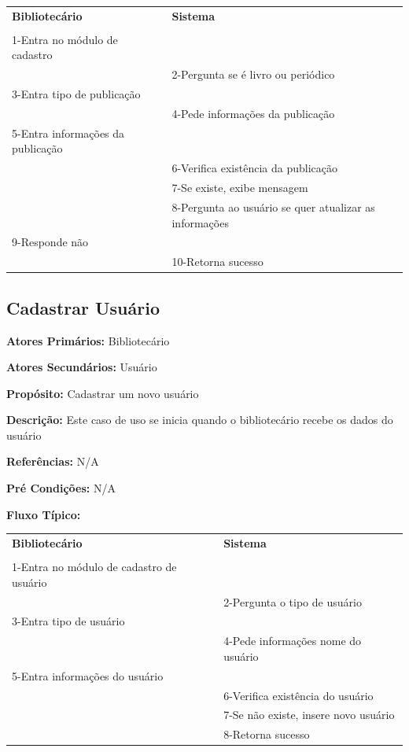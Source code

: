 \documentclass[
	12pt,				%
	openright,			%
	oneside,			%
	a4paper,			%
	english,			%
	brazil				%
	]{abntex2}
\begin{document}
\begin{table}[H]
\ABNTEXfontereduzida
\begin{center}
\begin{tabular}{p{5.5cm} p{5.5cm}}
    \textbf{Bibliotecário} & \textbf{Sistema}\\
     & \\
    1-Entra no módulo de cadastro& \\
     & 2-Pergunta se é livro ou periódico\\
    3-Entra tipo de publicação & \\
     & 4-Pede informações da publicação\\
    5-Entra informações da publicação & \\
     & 6-Verifica existência da publicação\\
     & 7-Se existe, exibe mensagem\\
     & 8-Pergunta ao usuário se quer atualizar as informações\\
    9-Responde não & \\
     & 10-Retorna sucesso\\
\end{tabular}
\end{center}
\end{table} 

\subsection{Cadastrar Usuário}

\textbf{Atores Primários:} Bibliotecário

\textbf{Atores Secundários:} Usuário

\textbf{Propósito:}      Cadastrar um novo usuário

\textbf{Descrição:}      Este caso de uso se inicia quando o bibliotecário recebe os dados do usuário

\textbf{Referências:} N/A

\textbf{Pré Condições:} N/A

\textbf{Fluxo Típico:} 

\begin{table}[H]
\ABNTEXfontereduzida
\begin{center}
\begin{tabular}{p{5.5cm} p{5.5cm}}
    \textbf{Bibliotecário} & \textbf{Sistema}\\
     & \\
    1-Entra no módulo de cadastro de usuário& \\
     & 2-Pergunta o tipo de usuário\\
    3-Entra tipo de usuário & \\
     & 4-Pede informações nome do usuário\\
    5-Entra informações do usuário & \\
     & 6-Verifica existência do usuário\\
     & 7-Se não existe, insere novo usuário\\
     & 8-Retorna sucesso\\
\end{tabular}
\end{center}
\end{table} 
                
\end{document}
